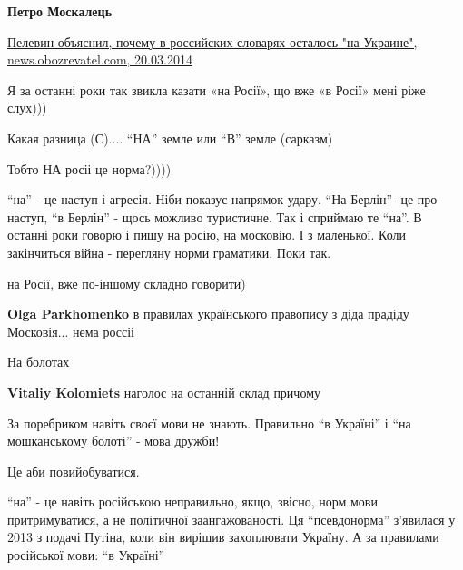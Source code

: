 \begin{itemize}
\begin{itemize} %
\textbf{Петро Москалець}

\href{https://news.obozrevatel.com/politics/18654-pelevin-obyasnil-pochemu-govorit-na-ukraine-nepravilno.htm}{%
Пелевин объяснил, почему в российских словарях осталось "на Украине", news.obozrevatel.com, 20.03.2014%
}

\end{itemize} %

Я за останні роки так звикла казати «на Росії», що вже «в Росії» мені ріже слух)))

Какая разница (С).... \enquote{НА} земле или \enquote{В} земле (сарказм)

Тобто НА росіі це норма?))))


\enquote{на} - це наступ і агресія. Ніби показує напрямок удару.  \enquote{На
Берлін}- це про наступ, \enquote{в Берлін} - щось можливо туристичне.  Так і
сприймаю те \enquote{на}.  В останні роки говорю і пишу на росію, на московію.
І з маленької. Коли закінчиться війна - перегляну норми граматики. Поки так.

на Росії, вже по-іншому складно говорити)

\begin{itemize} %
\textbf{Olga Parkhomenko} в правилах українського правопису з діда прадіду Московія... нема россіі
\end{itemize} %

На болотах

\textbf{Vitaliy Kolomiets} наголос на останній склад причому


За поребриком навіть своєї мови не знають. Правильно \enquote{в Україні} і
\enquote{на мошканському болоті} - мова дружби!

Це аби повийобуватися.


\enquote{на} - це навіть російською неправильно, якщо, звісно, норм мови притримуватися, а не політичної заангажованості.
Ця \enquote{псевдонорма} з'явилася у 2013 з подачі Путіна, коли він вирішив захоплювати Україну.
А за правилами російської мови: \enquote{в Україні}

\end{itemize} %
